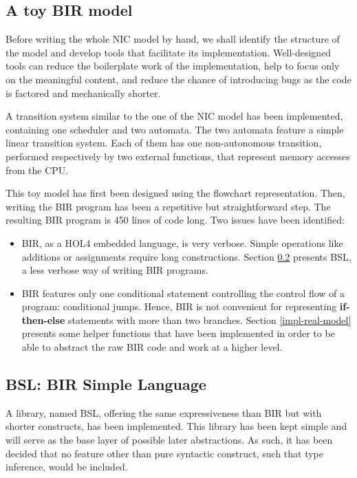 \documentclass[10pt,a4paper]{article}
\begin{document}
\begin{multicols}{2}
\subsection{A toy BIR model} \label{alice-bob-toy}

Before writing the whole NIC model by hand, we shall identify the structure of the model and develop tools that facilitate its implementation. Well-designed tools can reduce the boilerplate work of the implementation, help to focus only on the meaningful content, and reduce the chance of introducing bugs as the code is factored and mechanically shorter.

A transition system similar to the one of the NIC model has been implemented, containing one scheduler and two automata. The two automata feature a simple linear transition system. Each of them has one non-autonomous transition, performed respectively by two external functions, that represent memory accesses from the CPU.

This toy model has first been designed using the flowchart representation. Then, writing the BIR program has been a repetitive but straightforward step. The resulting BIR program is \num{450} lines of code long. Two issues have been identified:

\begin{itemize}
    \item BIR, as a HOL4 embedded language, is very verbose. Simple operations like additions or assignments require long constructions. Section \ref{bsl} presents BSL, a less verbose way of writing BIR programs.
    \item BIR features only one conditional statement controlling the control flow of a program: conditional jumps. Hence, BIR is not convenient for representing \textbf{if-then-else} statements with more than two branches. Section \ref{impl-real-model} presents some helper functions that have been implemented in order to be able to abstract the raw BIR code and work at a higher level.
\end{itemize}

\subsection{BSL: BIR Simple Language} \label{bsl}

A library, named BSL, offering the same expressiveness than BIR but with shorter constructs, has been implemented. This library has been kept simple and will serve as the base layer of possible later abstractions. As such, it has been decided that no feature other than pure syntactic construct, such that type inference, would be included.


\end{multicols}
\end{document}
